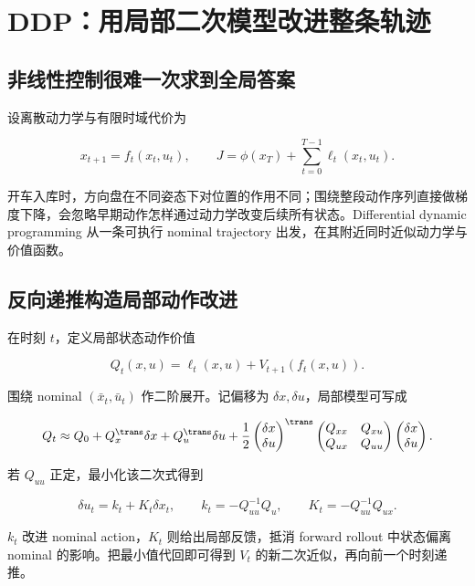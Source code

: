 \section{DDP：用局部二次模型改进整条轨迹}
\label{sec:16-Control-and-Reinforcement-Learning/01-Optimal-Control/05}

\subsection{非线性控制很难一次求到全局答案}

设离散动力学与有限时域代价为

\[
x_{t+1}=f_t(x_t,u_t),
\qquad
J=\phi(x_T)+\sum_{t=0}^{T-1}\ell_t(x_t,u_t).
\]

开车入库时，方向盘在不同姿态下对位置的作用不同；围绕整段动作序列直接做梯度下降，会忽略早期动作怎样通过动力学改变后续所有状态。Differential dynamic programming 从一条可执行 nominal trajectory 出发，在其附近同时近似动力学与价值函数。

\subsection{反向递推构造局部动作改进}

在时刻 \(t\)，定义局部状态动作价值

\[
Q_t(x,u)
=\ell_t(x,u)+V_{t+1}(f_t(x,u)).
\]

围绕 nominal \((\bar x_t,\bar u_t)\) 作二阶展开。记偏移为 \(\delta x,\delta u\)，局部模型可写成

\[
Q_t\approx Q_0+Q_x^\trans\delta x+Q_u^\trans\delta u
+\frac12
\begin{pmatrix}\delta x\\\delta u\end{pmatrix}^\trans
\begin{pmatrix}Q_{xx}&Q_{xu}\\Q_{ux}&Q_{uu}\end{pmatrix}
\begin{pmatrix}\delta x\\\delta u\end{pmatrix}.
\]

若 \(Q_{uu}\) 正定，最小化该二次式得到

\[
\delta u_t=k_t+K_t\delta x_t,
\qquad
k_t=-Q_{uu}^{-1}Q_u,
\qquad
K_t=-Q_{uu}^{-1}Q_{ux}.
\]

\(k_t\) 改进 nominal action，\(K_t\) 则给出局部反馈，抵消 forward rollout 中状态偏离 nominal 的影响。把最小值代回即可得到 \(V_t\) 的新二次近似，再向前一个时刻递推。

